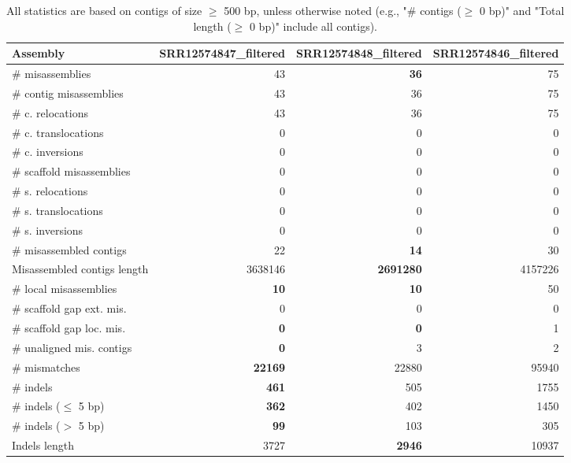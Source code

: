 \documentclass[12pt,a4paper]{article}
\begin{document}
\begin{table}[ht]
\begin{center}
\caption{All statistics are based on contigs of size $\geq$ 500 bp, unless otherwise noted (e.g., "\# contigs ($\geq$ 0 bp)" and "Total length ($\geq$ 0 bp)" include all contigs).}
\begin{tabular}{|l*{3}{|r}|}
\hline
Assembly & SRR12574847\_filtered & SRR12574848\_filtered & SRR12574846\_filtered \\ \hline
\# misassemblies & 43 & {\bf 36} & 75 \\ \hline
\hspace{2mm}\# contig misassemblies & 43 & 36 & 75 \\ \hline
\hspace{5mm}\# c. relocations & 43 & 36 & 75 \\ \hline
\hspace{5mm}\# c. translocations & 0 & 0 & 0 \\ \hline
\hspace{5mm}\# c. inversions & 0 & 0 & 0 \\ \hline
\hspace{2mm}\# scaffold misassemblies & 0 & 0 & 0 \\ \hline
\hspace{5mm}\# s. relocations & 0 & 0 & 0 \\ \hline
\hspace{5mm}\# s. translocations & 0 & 0 & 0 \\ \hline
\hspace{5mm}\# s. inversions & 0 & 0 & 0 \\ \hline
\# misassembled contigs & 22 & {\bf 14} & 30 \\ \hline
Misassembled contigs length & 3638146 & {\bf 2691280} & 4157226 \\ \hline
\# local misassemblies & {\bf 10} & {\bf 10} & 50 \\ \hline
\# scaffold gap ext. mis. & 0 & 0 & 0 \\ \hline
\# scaffold gap loc. mis. & {\bf 0} & {\bf 0} & 1 \\ \hline
\# unaligned mis. contigs & {\bf 0} & 3 & 2 \\ \hline
\# mismatches & {\bf 22169} & 22880 & 95940 \\ \hline
\# indels & {\bf 461} & 505 & 1755 \\ \hline
\hspace{5mm}\# indels ($\leq$ 5 bp) & {\bf 362} & 402 & 1450 \\ \hline
\hspace{5mm}\# indels ($>$ 5 bp) & {\bf 99} & 103 & 305 \\ \hline
Indels length & 3727 & {\bf 2946} & 10937 \\ \hline
\end{tabular}
\end{center}
\end{table}
\end{document}
